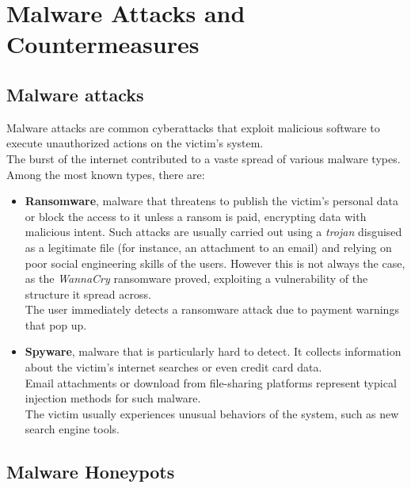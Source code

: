 \section{Malware Attacks and Countermeasures}
\subsection{Malware attacks}
Malware attacks are common cyberattacks that exploit malicious software to execute unauthorized actions on the victim's system.\\
The burst of the internet contributed to a vaste spread of various malware types. Among the most known types, there are:
\begin{itemize}
  \item \textbf{Ransomware}, malware that threatens to publish the victim's personal data or block the access to it unless a ransom is paid, encrypting data with malicious intent. Such attacks are usually carried out using a \textit{trojan} disguised as a legitimate file (for instance, an attachment to an email) and relying on poor social engineering skills of the users. However this is not always the case, as the \textit{WannaCry} ransomware proved, exploiting a vulnerability of the structure it spread across.\\
  The user immediately detects a ransomware attack due to payment warnings that pop up.
  \item \textbf{Spyware}, malware that is particularly hard to detect. It collects information about the victim's internet searches or even credit card data.\\
  Email attachments or download from file-sharing platforms represent typical injection methods for such malware.\\
  The victim usually experiences unusual behaviors of the system, such as new search engine tools.
\end{itemize}
\subsection{Malware Honeypots}

